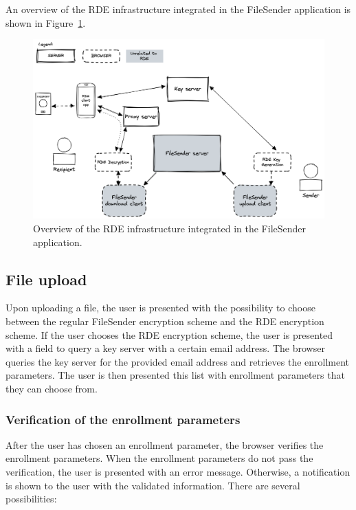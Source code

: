 An overview of the RDE infrastructure integrated in the FileSender application is shown in Figure~\ref{fig:filesender-infrastructure}.
\begin{figure}
    \centering
    \includegraphics[width=\linewidth]{imgs/Filesender infra overview}
    \caption{Overview of the RDE infrastructure integrated in the FileSender application.}
    \label{fig:filesender-infrastructure}
\end{figure}

\subsection{File upload}\label{subsec:file-upload}
Upon uploading a file, the user is presented with the possibility to choose between the regular FileSender encryption scheme and the RDE encryption scheme.
If the user chooses the RDE encryption scheme, the user is presented with a field to query a key server with a certain email address.
The browser queries the key server for the provided email address and retrieves the enrollment parameters.
The user is then presented this list with enrollment parameters that they can choose from.

\subsubsection{Verification of the enrollment parameters}
After the user has chosen an enrollment parameter, the browser verifies the enrollment parameters.
When the enrollment parameters do not pass the verification, the user is presented with an error message.
Otherwise, a notification is shown to the user with the validated information.
There are several possibilities:

